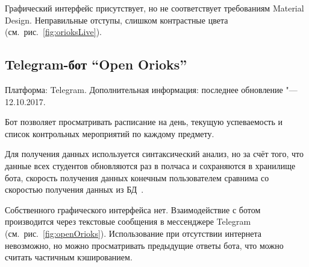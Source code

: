 Графический интерфейс присутствует, но не соответствует требованиям Material Design.
Неправильные отступы, слишком контрастные цвета (см.~рис.~\ref{fig:orioksLive}).

\subsection{Telegram-бот ``Open Orioks''}
\label{subsec:botOpenOrioks}
Платформа: Telegram.
Дополнительная информация: последнее обновление "--- 12.10.2017.

Бот позволяет просматривать расписание на день, текущую успеваемость и список контрольных мероприятий по каждому предмету.

Для получения данных используется синтаксический анализ, но за счёт того, что данные всех студентов обновляются раз в полчаса и сохраняются в хранилище бота, скорость получения данных конечным пользователем сравнима со скоростью получения данных из БД~\cite{github:openOrioks}.

Собственного графического интерфейса нет.
Взаимодействие с ботом производится через текстовые сообщения в мессенджере Telegram (см.~рис.~\ref{fig:openOrioks}).
Использование при отсутствии интернета невозможно, но можно просматривать предыдущие ответы бота, что можно считать частичным кэшированием.

